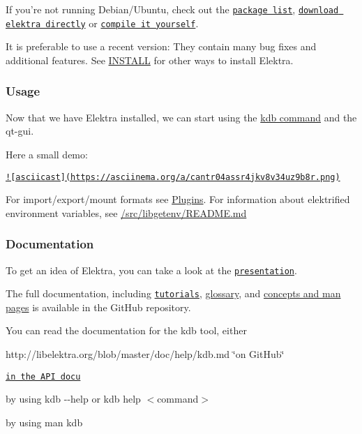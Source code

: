 If you're not running Debian/\+Ubuntu, check out the \href{#packages}{\tt package list}, \href{#download}{\tt download elektra directly} or \href{#compiling}{\tt compile it yourself}.

It is preferable to use a recent version\+: They contain many bug fixes and additional features. See \hyperlink{doc_INSTALL_md}{I\+N\+S\+T\+A\+L\+L} for other ways to install Elektra.

\subsubsection*{Usage}

Now that we have Elektra installed, we can start using the \hyperlink{md_doc_help_kdb_doc_help_kdb_md}{kdb command} and the qt-\/gui.

Here a small demo\+:

\href{https://asciinema.org/a/cantr04assr4jkv8v34uz9b8r}{\tt !\mbox{[}asciicast\mbox{]}(https\+://asciinema.\+org/a/cantr04assr4jkv8v34uz9b8r.\+png)}

For import/export/mount formats see \hyperlink{md_src_plugins_README_src_plugins_README_md}{Plugins}. For information about elektrified environment variables, see \hyperlink{md_src_libs_getenv_README_src_libs_getenv_README_md}{/src/libgetenv/\+R\+E\+A\+D\+M\+E.md}

\subsubsection*{Documentation}

To get an idea of Elektra, you can take a look at the \href{http://www.libelektra.org/ftp/elektra/presentations/2016/FOSDEM/fosdem.odp}{\tt presentation}.

The full documentation, including \href{http://libelektra.org/blob/master/doc/tutorials/}{\tt tutorials}, \hyperlink{md_doc_help_elektra-glossary_doc_help_elektra-glossary_md}{glossary}, and \hyperlink{md_doc_help_elektra-introduction_doc_help_elektra-introduction_md}{concepts and man pages} is available in the Git\+Hub repository.

You can read the documentation for the kdb tool, either


\begin{DoxyItemize}
\item http\+://libelektra.org/blob/master/doc/help/kdb.\+md \char`\"{}on Git\+Hub\char`\"{}
\item \href{http://doc.libelektra.org/api/latest/html/md_doc_help_kdb.html}{\tt in the A\+P\+I docu}
\item by using {\ttfamily kdb -\/-\/help} or {\ttfamily kdb help $<$command$>$}
\item by using {\ttfamily man kdb}
\end{DoxyItemize}

